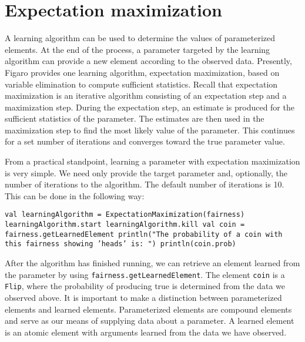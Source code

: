 \section{Expectation maximization}

A learning algorithm can be used to determine the values of parameterized elements. At the end of the process, a parameter targeted by the learning algorithm can provide a new element according to the observed data. Presently, Figaro provides one learning algorithm, expectation maximization, based on variable elimination to compute sufficient statistics. Recall that expectation maximization is an iterative algorithm consisting of an expectation step and a maximization step. During the expectation step, an estimate is produced for the sufficient statistics of the parameter. The estimates are then used in the maximization step to find the most likely value of the parameter. This continues for a set number of iterations and converges toward the true parameter value.

From a practical standpoint, learning a parameter with expectation maximization is very simple. We need only provide the target parameter and, optionally, the number of iterations to the algorithm. The default number of iterations is 10. This can be done in the following way:

\begin{flushleft}
\texttt{val learningAlgorithm = ExpectationMaximization(fairness)
\newline learningAlgorithm.start
\newline learningAlgorithm.kill
\newline 
\newline val coin = fairness.getLearnedElement
\newline println("The probability of a coin with this fairness showing
'heads' is: ")
\newline println(coin.prob)
}
\end{flushleft}

After the algorithm has finished running, we can retrieve an element learned from the parameter by using \texttt{fairness.getLearnedEle\-ment}. The element \texttt{coin} is a \texttt{Flip}, where the probability of producing true is determined from the data we observed above. It is important to make a distinction between parameterized elements and learned elements. Parameterized elements are compound elements and serve as our means of supplying data about a parameter. A learned element is an atomic element with arguments learned from the data we have observed.

